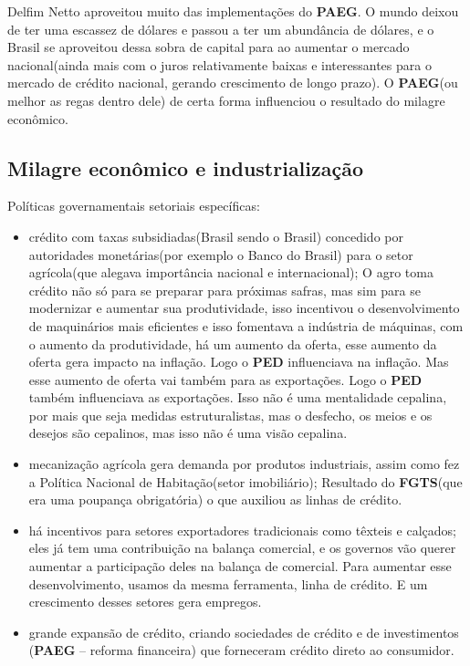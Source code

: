 \documentclass[a4paper,12pt]{article}[abntex2]
\begin{document}
Delfim Netto aproveitou muito das implementações do \textbf{PAEG}. O mundo deixou de ter uma escassez de dólares e passou a ter um abundância de dólares, e o Brasil se aproveitou dessa sobra de capital para ao aumentar o mercado nacional(ainda mais com o juros relativamente baixas e interessantes para o mercado de crédito nacional, gerando crescimento de longo prazo). O \textbf{PAEG}(ou melhor as regas dentro dele) de certa forma influenciou o resultado do milagre econômico.

\subsection{\textbf{Milagre econômico e industrialização}}
Políticas governamentais setoriais específicas:\begin{itemize}
    \item crédito com taxas subsidiadas(Brasil sendo o Brasil) concedido por autoridades monetárias(por exemplo o Banco do Brasil) para o setor agrícola(que alegava importância nacional e internacional); O agro toma crédito não só para se preparar para próximas safras, mas sim para se modernizar e aumentar sua produtividade, isso incentivou o desenvolvimento de maquinários mais eficientes e isso fomentava a indústria de máquinas, com o aumento da produtividade, há um aumento da oferta, esse aumento da oferta gera impacto na inflação. Logo o \textbf{PED} influenciava na inflação. Mas esse aumento de oferta vai também para as exportações. Logo o \textbf{PED} também influenciava as exportações. Isso não é uma mentalidade cepalina, por mais que seja medidas estruturalistas, mas o desfecho, os meios e os desejos são cepalinos, mas isso não é uma visão cepalina.
    \item mecanização agrícola gera demanda por produtos industriais, assim como fez a Política Nacional de Habitação(setor imobiliário); Resultado do \textbf{FGTS}(que era uma poupança obrigatória) o que auxiliou as linhas de crédito.
    \item há incentivos para setores exportadores tradicionais como têxteis e calçados; eles já tem uma contribuição na balança comercial, e os governos vão querer aumentar a participação deles na balança de comercial. Para aumentar esse desenvolvimento, usamos da mesma ferramenta, linha de crédito. E um crescimento desses setores gera empregos.
    \item grande expansão de crédito, criando sociedades de crédito e de investimentos (\textbf{PAEG} – reforma financeira) que forneceram crédito direto ao consumidor.
\end{itemize}
\end{document}
